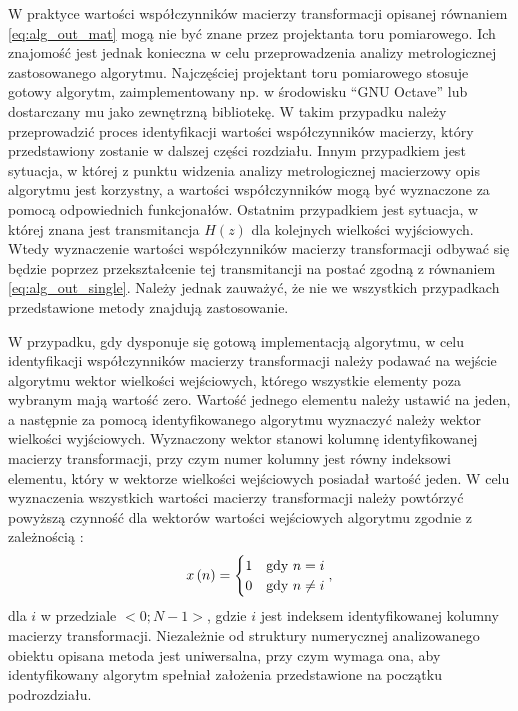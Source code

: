 W praktyce wartości współczynników macierzy transformacji opisanej równaniem \eqref{eq:alg_out_mat} mogą nie być znane przez projektanta toru pomiarowego. Ich znajomość jest jednak konieczna w celu przeprowadzenia analizy metrologicznej zastosowanego algorytmu. Najczęściej projektant toru pomiarowego stosuje gotowy algorytm, zaimplementowany np. w środowisku \enquote{GNU Octave} lub dostarczany mu jako zewnętrzną bibliotekę. W takim przypadku należy przeprowadzić proces identyfikacji wartości współczynników macierzy, który przedstawiony zostanie w dalszej części rozdziału. Innym przypadkiem jest sytuacja, w której z punktu widzenia analizy metrologicznej macierzowy opis algorytmu jest korzystny, a wartości współczynników mogą być wyznaczone za pomocą odpowiednich funkcjonałów. Ostatnim przypadkiem jest sytuacja, w której znana jest transmitancja $H(z)$ dla kolejnych wielkości wyjściowych. Wtedy wyznaczenie wartości współczynników macierzy transformacji odbywać się będzie poprzez przekształcenie tej transmitancji na postać zgodną z równaniem \eqref{eq:alg_out_single}. Należy jednak zauważyć, że nie we wszystkich przypadkach przedstawione metody znajdują zastosowanie.

W przypadku, gdy dysponuje się gotową implementacją algorytmu, w celu identyfikacji współczynników macierzy transformacji należy podawać na wejście algorytmu wektor wielkości wejściowych, którego wszystkie elementy poza wybranym mają wartość zero. Wartość jednego elementu należy ustawić na jeden, a następnie za pomocą identyfikowanego algorytmu wyznaczyć należy wektor wielkości wyjściowych. Wyznaczony wektor stanowi kolumnę identyfikowanej macierzy transformacji, przy czym numer kolumny jest równy indeksowi elementu, który w wektorze wielkości wejściowych posiadał wartość jeden. W celu wyznaczenia wszystkich wartości macierzy transformacji należy powtórzyć powyższą czynność dla wektorów wartości wejściowych algorytmu zgodnie z zależnością \cite{jakubiec_algorithms}:
\begin{equation}
x \left( n \right) =
\begin{cases}
	1 & $gdy$ ~ n = i \\
	0 & $gdy$ ~ n \neq i
\end{cases}
\label{eq:wt_ident},
\end{equation}
dla $i$ w przedziale $<0;N-1>$, gdzie $i$ jest indeksem identyfikowanej kolumny macierzy transformacji. Niezależnie od struktury numerycznej analizowanego obiektu opisana metoda jest uniwersalna, przy czym wymaga ona, aby identyfikowany algorytm spełniał założenia przedstawione na początku podrozdziału.

